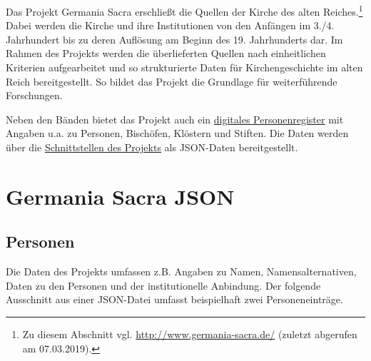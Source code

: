 \documentclass[ngerman,]{scrreprt}
\begin{document}
Das Projekt Germania Sacra erschließt die Quellen der Kirche des alten Reiches.\footnote{Zu diesem Abschnitt vgl. \url{http://www.germania-sacra.de/} (zuletzt abgerufen am 07.03.2019).} Dabei werden die Kirche und ihre Institutionen von den Anfängen im 3./4. Jahrhundert bis zu deren Auflösung am Beginn des 19. Jahrhunderts dar. Im Rahmen des Projekts werden die überlieferten Quellen nach einheitlichen Kriterien aufgearbeitet und so strukturierte Daten für Kirchengeschichte im alten Reich bereitgestellt. So bildet das Projekt die Grundlage für weiterführende Forschungen.

Neben den Bänden bietet das Projekt auch ein \href{https://adw-goe.de/forschung/forschungsprojekte-akademienprogramm/germania-sacra/digitales-personenregister/}{digitales Personenregister} mit Angaben u.a. zu Personen, Bischöfen, Klöstern und Stiften. Die Daten werden über die \href{https://adw-goe.de/forschung/forschungsprojekte-akademienprogramm/germania-sacra/schnittstellen-und-linked-data/}{Schnittstellen des Projekts} als JSON-Daten bereitgestellt.

\section{Germania Sacra JSON}\label{germania-sacra-json}

\subsection{Personen}\label{personen}

Die Daten des Projekts umfassen z.B. Angaben zu Namen, Namensalternativen, Daten zu den Personen und der institutionelle Anbindung. Der folgende Ausschnitt aus einer JSON-Datei umfasst beispielhaft zwei Personeneinträge.
\end{document}
